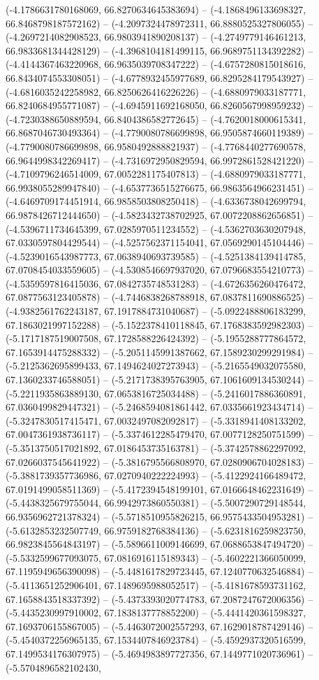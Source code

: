 (-4.1786631780168069, 66.8270634645383694) -- (-4.1868496133698327, 66.8468798187572162) -- (-4.2097324478972311, 66.8880525327806055) -- (-4.2697214082908523, 66.9803941890208137) -- (-4.2749779146461213, 66.9833681344428129) -- (-4.3968104181499115, 66.9689751134392282) -- (-4.4144367463220968, 66.9635039708347222) -- (-4.6757280815018616, 66.8434074553308051) -- (-4.6778932455977689, 66.8295284179543927) -- (-4.6816035242258982, 66.8250626416226226) -- (-4.6880979033187771, 66.8240684955771087) -- (-4.6945911692168050, 66.8260567998959232) -- (-4.7230388650889594, 66.8404386582772645) -- (-4.7620018000615341, 66.8687046730493364) -- (-4.7790080786699898, 66.9505874660119389) -- (-4.7790080786699898, 66.9580492888821937) -- (-4.7768440277690578, 66.9644998342269417) -- (-4.7316972950829594, 66.9972861528421220) -- (-4.7109796246514009, 67.0052281175407813) -- (-4.6880979033187771, 66.9938055289947840) -- (-4.6537736515276675, 66.9863564966231451) -- (-4.6469709174451914, 66.9858503808250418) -- (-4.6336738042699794, 66.9878426712444650) -- (-4.5823432738702925, 67.0072208862656851) -- (-4.5396711734645399, 67.0285970511234552) -- (-4.5362703630207948, 67.0330597804429544) -- (-4.5257562371154041, 67.0569290145104446) -- (-4.5239016543987773, 67.0638940693739585) -- (-4.5251384139414785, 67.0708454033559605) -- (-4.5308546697937020, 67.0796683554210773) -- (-4.5359597816415036, 67.0842735748531283) -- (-4.6726356260476472, 67.0877563123405878) -- (-4.7446838268788918, 67.0837811690886525) -- (-4.9382561762243187, 67.1917884731040687) -- (-5.0922488806183299, 67.1863021997152288) -- (-5.1522378410118845, 67.1768383592982303) -- (-5.1717187519007508, 67.1728588226424392) -- (-5.1955288777864572, 67.1653914475288332) -- (-5.2051145991387662, 67.1589230299291984) -- (-5.2125362695899433, 67.1494624027273943) -- (-5.2165549032075580, 67.1360233746588051) -- (-5.2171738395763905, 67.1061609134530244) -- (-5.2211935863889130, 67.0653816725034488) -- (-5.2416017886360891, 67.0360499829447321) -- (-5.2468594081861442, 67.0335661923434714) -- (-5.3247830517415471, 67.0032497082092817) -- (-5.3318941408133202, 67.0047361938736117) -- (-5.3374612285479470, 67.0077128250751599) -- (-5.3513750517021892, 67.0186453735163781) -- (-5.3742578862297092, 67.0266037545641922) -- (-5.3816795566808970, 67.0280906704028183) -- (-5.3881739357736986, 67.0270940222224993) -- (-5.4122924166489472, 67.0191499058511369) -- (-5.4172394548199101, 67.0166648462231649) -- (-5.4438325679755044, 66.9942973860550381) -- (-5.5007290729148544, 66.9356962721378324) -- (-5.5718510955826215, 66.9575433504953281) -- (-5.6132853232507749, 66.9759182768384136) -- (-5.6231816259823750, 66.9823845564843197) -- (-5.5896611009146699, 67.0688653847494720) -- (-5.5332599677093075, 67.0816916115189343) -- (-5.4602221366050099, 67.1195949656390098) -- (-5.4481617829723445, 67.1240770632546884) -- (-5.4113651252906401, 67.1489695988052517) -- (-5.4181678593731162, 67.1658843518337392) -- (-5.4373393020774783, 67.2087247672006356) -- (-5.4435230997910002, 67.1838137778852200) -- (-5.4441420361598327, 67.1693706155867005) -- (-5.4463072002557293, 67.1629018787429146) -- (-5.4540372256965135, 67.1534407846923784) -- (-5.4592937320516599, 67.1499534176307975) -- (-5.4694983897727356, 67.1449771020736961) -- (-5.5704896582102430, 